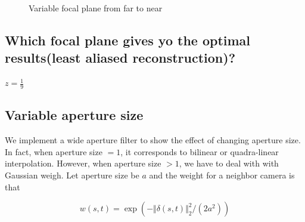 \documentclass[acmtog]{acmart}
\begin{document}
\begin{figure}[htbp]
{				\label{fig:Fig14}}
			\quad
			\quad
			\caption{Variable focal plane from far to near}
		\end{figure}

	
	\subsection*{Which focal plane gives yo the optimal results(least aliased reconstruction)?}
	\quad $z=\frac{1}{9}$

	\subsection{Variable aperture size}
		\quad We implement a wide aperture filter to show the effect of changing aperture size. In fact, when aperture size $=1$, it corresponds to bilinear or quadra-linear interpolation. However, when aperture size $>1$, we have to deal with with Gaussian weigh. Let aperture size be $a$ and the weight for a neighbor camera is that 
		
		\[
		w(s, t) = \exp(-\Vert\delta(s, t)\Vert_2^2 / (2a^2))
		\]
		
\end{document}
